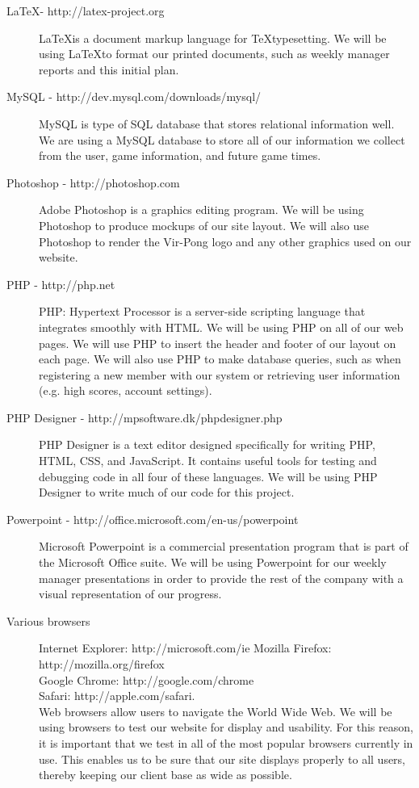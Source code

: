 \begin{description}
		\item[\LaTeX - http://latex-project.org] \LaTeX is a document markup language for \TeX typesetting. We will be using \LaTeX to format our printed documents, such as weekly manager reports and this initial plan.
		\item[MySQL -  http://dev.mysql.com/downloads/mysql/] MySQL is  type of SQL database that stores relational information well. We are using a MySQL database to store all of our information we collect from the user, game information, and future game times.
		\item[Photoshop - http://photoshop.com] Adobe Photoshop is a graphics editing program. We will be using Photoshop to produce mockups of our site layout. We will also use Photoshop to render the Vir-Pong logo and any other graphics used on our website.
		\item[PHP - http://php.net] PHP: Hypertext Processor is a server-side scripting language that integrates smoothly with HTML. We will be using PHP on all of our web pages. We will use PHP to insert the header and footer of our layout on each page. We will also use PHP to make database queries, such as when registering a new member with our system or retrieving user information (e.g. high scores, account settings).
		\item[PHP Designer - http://mpsoftware.dk/phpdesigner.php] PHP Designer is a text editor designed specifically for writing PHP, HTML, CSS, and JavaScript. It contains useful tools for testing and debugging code in all four of these languages. We will be using PHP Designer to write much of our code for this project.
		\item[Powerpoint - http://office.microsoft.com/en-us/powerpoint] Microsoft Powerpoint is a commercial presentation program that is part of the Microsoft Office suite. We will be using Powerpoint for our weekly manager presentations in order to provide the rest of the company with a visual representation of our progress.
		\item[Various browsers] Internet Explorer: http://microsoft.com/ie \newline Mozilla Firefox: http://mozilla.org/firefox\\Google Chrome: http://google.com/chrome\\Safari: http://apple.com/safari.\\Web browsers allow users to navigate the World Wide Web. We will be using browsers to test our website for display and usability. For this reason, it is important that we test in all of the most popular browsers currently in use. This enables us to be sure that our site displays properly to all users, thereby keeping our client base as wide as possible.
	\end{description}


